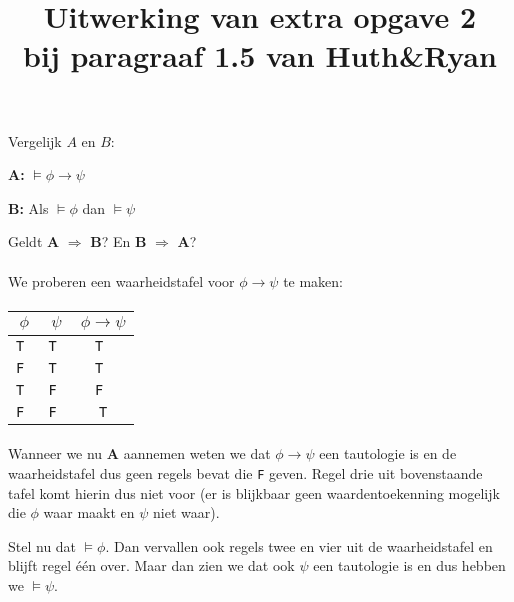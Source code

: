 \documentclass[a4paper,11pt]{article}
\title{Uitwerking van extra opgave 2\\
\normalsize{bij paragraaf 1.5 van Huth\&Ryan}}
\date{}
\begin{document}
\maketitle


Vergelijk $A$ en $B$:

\begin{description}

\item{\bf A:}
$\models \phi \rightarrow \psi$

\item{\bf B:}
Als $\models \phi$ dan $\models \psi$

\end{description}

Geldt \textbf{A} $\Rightarrow$ \textbf{B}? En \textbf{B} $\Rightarrow$ \textbf{A}?

\paragraph{}

We proberen een waarheidstafel voor $\phi \rightarrow \psi$ te maken:

\paragraph{}

\begin{tabular}{c|c|c}
$\phi$   & $\psi$   & $\phi \rightarrow \psi$ \\
\hline
\tt T    & \tt T    & \tt T \\
\tt F    & \tt T    & \tt T \\
\tt T    & \tt F    & \tt F \\
\tt F    & \tt F    & \tt T
\end{tabular}

\paragraph{}

Wanneer we nu \textbf{A} aannemen weten we dat $\phi \rightarrow \psi$
een tautologie is en de waarheidstafel dus geen regels bevat
die \texttt{F} geven. Regel drie uit bovenstaande tafel komt hierin
dus niet voor (er is blijkbaar geen waardentoekenning mogelijk die
$\phi$ waar maakt en $\psi$ niet waar).

Stel nu dat $\models \phi$. Dan vervallen ook regels twee en vier
uit de waarheidstafel en blijft regel \'e\'en over. Maar dan zien
we dat ook $\psi$ een tautologie is en dus hebben we $\models \psi$.
\end{document}
